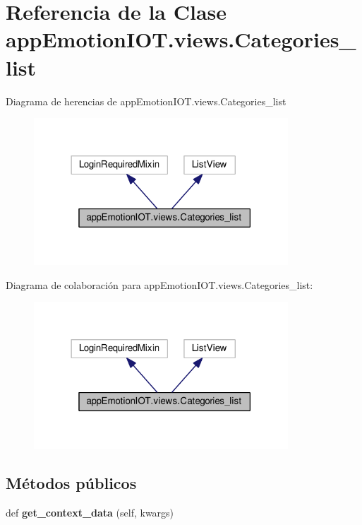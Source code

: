 \hypertarget{classappEmotionIOT_1_1views_1_1Categories__list}{}\section{Referencia de la Clase app\+Emotion\+I\+O\+T.\+views.\+Categories\+\_\+list}
\label{classappEmotionIOT_1_1views_1_1Categories__list}


Diagrama de herencias de app\+Emotion\+I\+O\+T.\+views.\+Categories\+\_\+list
\nopagebreak
\begin{figure}[H]
\begin{center}
\leavevmode
\includegraphics[width=270pt]{classappEmotionIOT_1_1views_1_1Categories__list__inherit__graph}
\end{center}
\end{figure}


Diagrama de colaboración para app\+Emotion\+I\+O\+T.\+views.\+Categories\+\_\+list\+:
\nopagebreak
\begin{figure}[H]
\begin{center}
\leavevmode
\includegraphics[width=270pt]{classappEmotionIOT_1_1views_1_1Categories__list__coll__graph}
\end{center}
\end{figure}
\subsection*{Métodos públicos}
\begin{DoxyCompactItemize}
\item 
def {\bfseries get\+\_\+context\+\_\+data} (self, kwargs)\hypertarget{classappEmotionIOT_1_1views_1_1Categories__list_ad33fd420205b6b84654c30455189fdbe}{}\label{classappEmotionIOT_1_1views_1_1Categories__list_ad33fd420205b6b84654c30455189fdbe}

\end{DoxyCompactItemize}
